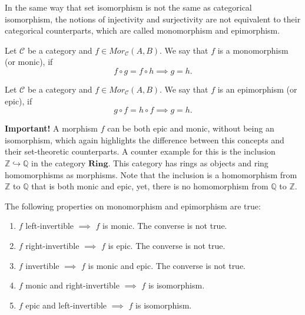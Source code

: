In the same way that set isomorphism is not the same as categorical isomorphism,
the notions of injectivity and surjectivity are not equivalent to their categorical
counterparts, which are called monomorphism and epimorphism.

\begin{definition}[Monomorphism]
	Let $\mathcal C$ be a category and $f \in Mor_\mathcal C(A,B)$. We say that
	$f$ is a monomorphism (or monic), if
	\begin{displaymath}
		f \circ g = f \circ h \implies g = h.
	\end{displaymath}
\end{definition}

\begin{definition}[Epimorphism]
	Let $\mathcal C$ be a category and $f \in Mor_\mathcal C(A,B)$. We say that
	$f$ is an epimorphism (or epic), if
	\begin{displaymath}
		g \circ f = h \circ f \implies g = h.
	\end{displaymath}
\end{definition}
\textbf{Important!} A morphism $f$ can be both epic and monic, without being
an isomorphism, which again highlights the difference between this concepts and their
set-theoretic counterparts. A counter example for this is the inclusion
$\mathbb Z \hookrightarrow \mathbb Q$ in the category $\mathbf{Ring}$.
This category has rings as objects and ring homomorphisms as morphisms.
Note that the inclusion is a homomorphism from $\mathbb Z$ to $\mathbb Q$ that is both monic and epic,
yet, there is no homomorphism from $\mathbb Q$ to $\mathbb Z$.

\begin{proposition}
	The following properties on monomorphism and epimorphism are true:
	\begin{enumerate}[1.]
		\item $f$ left-invertible $\implies$ $f$ is monic. The converse is not true.
		\item $f$ right-invertible $\implies$ $f$ is epic. The converse is not true.
		\item $f$ invertible $\implies$ $f$ is monic and epic. The converse is not true.
		\item $f$ monic and right-invertible $\implies $ $f$ is isomorphism.
		\item $f$ epic and left-invertible $\implies $ $f$ is isomorphism.
	\end{enumerate}
\end{proposition}

